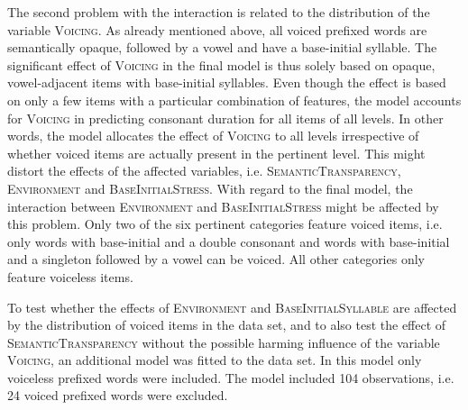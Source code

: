 The second problem with the interaction  
is related to the distribution of the variable \textsc{Voicing}. 
 As already mentioned above, all voiced prefixed words are semantically opaque, followed by a vowel and have a  base-initial syllable. The significant effect of \textsc{Voicing} in the final model is thus solely based on opaque, vowel-adjacent items with  base-initial syllables. Even though the effect is based on only a few items with a particular combination of features, the model accounts for \textsc{Voicing} in predicting consonant duration for all items of all levels. In other words, the model allocates the effect of \textsc{Voicing} to all levels irrespective of whether voiced items are actually present in the pertinent level. This might distort the effects of the affected variables, i.e. \textsc{SemanticTransparency}, \textsc{Environment} and \textsc{BaseInitialStress}. 
  With regard to the final model, the interaction between \textsc{Environment} and \textsc{BaseInitialStress} might be affected by this problem.
  Only two of the six pertinent categories feature voiced items, i.e. only words with base-initial  and a double consonant and words with base-initial  and a singleton followed by a vowel can be voiced. All other categories only feature voiceless items.
  
  
  
  To test whether the effects of \textsc{Environment} and \textsc{BaseInitialSyllable} are affected by the distribution of voiced items in the data set, and to also test the effect of \textsc{SemanticTransparency} without the possible harming influence of the variable \textsc{Voicing}, an additional model was fitted to the data set. In this model only voiceless prefixed words were included. The model included 104 observations, i.e. 24 voiced prefixed words were excluded. 
  
  


